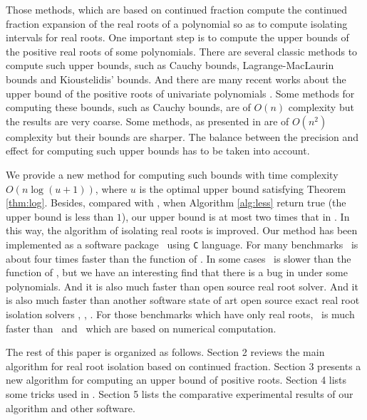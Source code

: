 Those methods, which are  based on  continued fraction compute the continued fraction expansion of the real roots of a polynomial so as to  compute isolating intervals for real roots. One important step
is to  compute the upper bounds of the positive real roots of some polynomials. There are  several classic methods to compute such upper bounds, such as Cauchy bounds, Lagrange-MacLaurin  bounds and Kioustelidis' bounds. And there are many recent works about the upper bound of the positive roots of univariate polynomials \cite{hong98,ste05,akr05,akr06,akr08}. Some methods for computing these bounds,  such as Cauchy bounds, are of $O(n)$ complexity but the results are very coarse. Some methods, as presented in  \cite{akr08} are of $O(n^2)$ complexity but their bounds are sharper. The balance between the precision and effect for computing such upper bounds has to be taken into account.

We provide a new method for computing such bounds with time complexity $O(n\log(u+1))$, where $u$ is the optimal upper bound satisfying Theorem \ref{thm:log}. Besides, compared
with \cite{akr08}, when  Algorithm \ref{alg:less} return true (the upper bound is less than $1$), our upper bound is at most two times that in \cite{akr08}. In this way, the algorithm of   isolating real roots is improved.  Our  method has been implemented as a  software package \froot\ using \texttt{C} language. {\color{red}For many benchmarks \froot \  is about four  times
faster   than  the function {\tt \REALROOT} of \MAPLE}.  {\color{red}In some cases \froot\ is slower than the function {\tt \inte} of \MM, but we have an interesting find that there is a bug in  {\tt \inte} under some polynomials. And it  is also much faster than   open source real root solver.} And it  is also much faster than   another software  state of art 
open source exact real root isolation solvers \cf, \AND, \SLV. For those  benchmarks which  have only real roots, \froot\ is much faster than \sle\ and \eign\ which are based on numerical computation. 


The rest of this paper is organized as follows. Section 2 reviews the
main algorithm for real root isolation based on  continued fraction. Section 3 presents a new algorithm for
computing an upper bound of positive roots. Section 4 lists some tricks used in \froot.  Section 5 lists the comparative experimental results of our algorithm and other software. %
